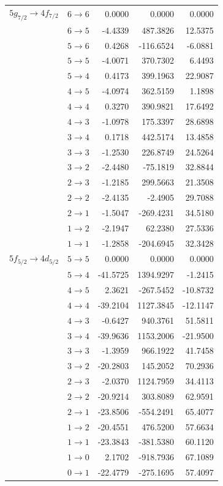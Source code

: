 \begin{table}[b]
\begin{tiny}
\begin{tabular}{cc|rrr}
$5g_{7/2} \rightarrow 4f_{7/2}$ & $6 \rightarrow 6$ & 0.0000 & 0.0000 & 0.0000 \\
& $6 \rightarrow 5$ & -4.4339 & 487.3826 & 12.5375 \\
& $5 \rightarrow 6$ & 0.4268 & -116.6524 & -6.0881 \\
& $5 \rightarrow 5$ & -4.0071 & 370.7302 & 6.4493 \\
& $5 \rightarrow 4$ & 0.4173 & 399.1963 & 22.9087 \\
& $4 \rightarrow 5$ & -4.0974 & 362.5159 & 1.1898 \\
& $4 \rightarrow 4$ & 0.3270 & 390.9821 & 17.6492 \\
& $4 \rightarrow 3$ & -1.0978 & 175.3397 & 28.6898 \\
& $3 \rightarrow 4$ & 0.1718 & 442.5174 & 13.4858 \\
& $3 \rightarrow 3$ & -1.2530 & 226.8749 & 24.5264 \\
& $3 \rightarrow 2$ & -2.4480 & -75.1819 & 32.8844 \\
& $2 \rightarrow 3$ & -1.2185 & 299.5663 & 21.3508 \\
& $2 \rightarrow 2$ & -2.4135 & -2.4905 & 29.7088 \\
& $2 \rightarrow 1$ & -1.5047 & -269.4231 & 34.5180 \\
& $1 \rightarrow 2$ & -2.1947 & 62.2380 & 27.5336 \\
& $1 \rightarrow 1$ & -1.2858 & -204.6945 & 32.3428 \\[7pt]

$5f_{5/2} \rightarrow 4d_{5/2}$ & $5 \rightarrow 5$ & 0.0000 & 0.0000 & 0.0000 \\
& $5 \rightarrow 4$ & -41.5725 & 1394.9297 & -1.2415 \\
& $4 \rightarrow 5$ & 2.3621 & -267.5452 & -10.8732 \\
& $4 \rightarrow 4$ & -39.2104 & 1127.3845 & -12.1147 \\
& $4 \rightarrow 3$ & -0.6427 & 940.3761 & 51.5811 \\
& $3 \rightarrow 4$ & -39.9636 & 1153.2006 & -21.9500 \\
& $3 \rightarrow 3$ & -1.3959 & 966.1922 & 41.7458 \\
& $3 \rightarrow 2$ & -20.2803 & 145.2052 & 70.2936 \\
& $2 \rightarrow 3$ & -2.0370 & 1124.7959 & 34.4113 \\
& $2 \rightarrow 2$ & -20.9214 & 303.8089 & 62.9591 \\
& $2 \rightarrow 1$ & -23.8506 & -554.2491 & 65.4077 \\
& $1 \rightarrow 2$ & -20.4551 & 476.5200 & 57.6634 \\
& $1 \rightarrow 1$ & -23.3843 & -381.5380 & 60.1120 \\
& $1 \rightarrow 0$ & 2.1702 & -918.7936 & 67.1089 \\
& $0 \rightarrow 1$ & -22.4779 & -275.1695 & 57.4097
\end{tabular}
\end{tiny}
\end{table}%
